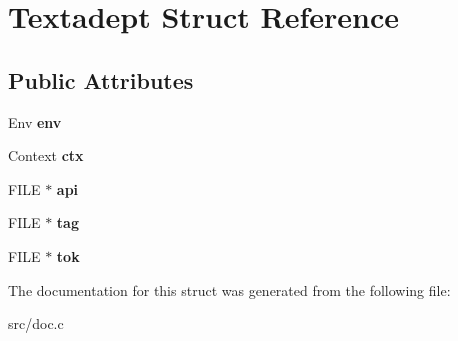 \hypertarget{structTextadept}{}\section{Textadept Struct Reference}
\label{structTextadept}
\subsection*{Public Attributes}
\begin{DoxyCompactItemize}
\item 
\hypertarget{structTextadept_adaa6b919e4b393cfce7d0690cead3e20}{}\label{structTextadept_adaa6b919e4b393cfce7d0690cead3e20} 
Env {\bfseries env}
\item 
\hypertarget{structTextadept_a7a309288e53cdf4f62eb371ba2057501}{}\label{structTextadept_a7a309288e53cdf4f62eb371ba2057501} 
Context {\bfseries ctx}
\item 
\hypertarget{structTextadept_af82117bfd82248cf100e68513066c124}{}\label{structTextadept_af82117bfd82248cf100e68513066c124} 
F\+I\+LE $\ast$ {\bfseries api}
\item 
\hypertarget{structTextadept_ad1b7caa9d1b687448d3108a0dbfb7dc2}{}\label{structTextadept_ad1b7caa9d1b687448d3108a0dbfb7dc2} 
F\+I\+LE $\ast$ {\bfseries tag}
\item 
\hypertarget{structTextadept_a90ee92fe1269edf4e5624efd22f790ec}{}\label{structTextadept_a90ee92fe1269edf4e5624efd22f790ec} 
F\+I\+LE $\ast$ {\bfseries tok}
\end{DoxyCompactItemize}


The documentation for this struct was generated from the following file\+:\begin{DoxyCompactItemize}
\item 
src/doc.\+c\end{DoxyCompactItemize}
